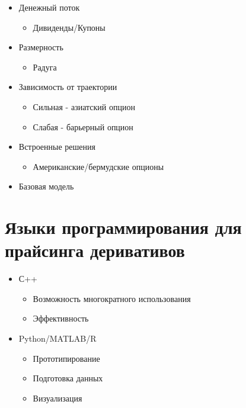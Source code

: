 \documentclass{article}
\begin{document}
\begin{itemize}

  \item Денежный поток
  
    \begin{itemize}
    \item Дивиденды/Купоны
    \end{itemize}
   
   
  \item Размерность
  
    \begin{itemize}
    \item Радуга
    \end{itemize}
   
  \item Зависимость от траектории


    \begin{itemize}
    \item Сильная - азиатский опцион
    \item Слабая - барьерный опцион
    \end{itemize}

  \item Встроенные решения


    \begin{itemize}
    \item Американские/бермудские опционы
    \end{itemize}

  \item Базовая модель
   
\end{itemize}

\section{Языки программирования для прайсинга деривативов}

\begin{itemize}

  \item С++
  
    \begin{itemize}
    \item Возможность многократного использования
    \item Эффективность
    \end{itemize}
   
   
  \item Python/MATLAB/R
  
    \begin{itemize}
    \item Прототипирование
    \item Подготовка данных
    \item Визуализация
    \end{itemize}

\end{itemize}
\end{document}

